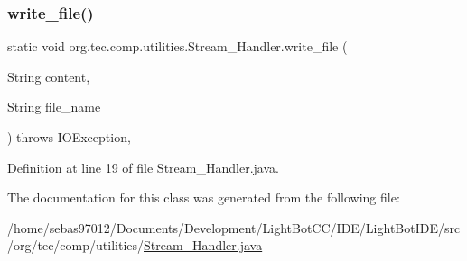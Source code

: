 \subsubsection{\texorpdfstring{write\+\_\+file()}{write\_file()}}
{\footnotesize\ttfamily static void org.\+tec.\+comp.\+utilities.\+Stream\+\_\+\+Handler.\+write\+\_\+file (\begin{DoxyParamCaption}\item[{String}]{content,  }\item[{String}]{file\+\_\+name }\end{DoxyParamCaption}) throws I\+O\+Exception\hspace{0.3cm}{\ttfamily [inline]}, {\ttfamily [static]}}



Definition at line 19 of file Stream\+\_\+\+Handler.\+java.



The documentation for this class was generated from the following file\+:\begin{DoxyCompactItemize}
\item 
/home/sebas97012/\+Documents/\+Development/\+Light\+Bot\+C\+C/\+I\+D\+E/\+Light\+Bot\+I\+D\+E/src/org/tec/comp/utilities/\mbox{\hyperlink{_stream___handler_8java}{Stream\+\_\+\+Handler.\+java}}\end{DoxyCompactItemize}
